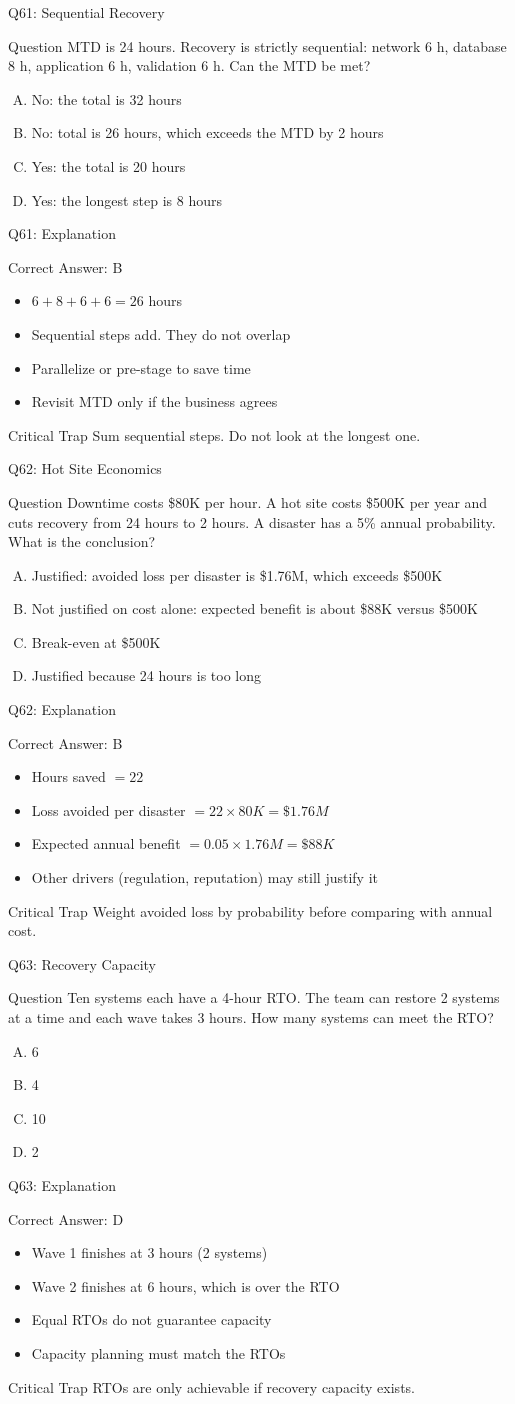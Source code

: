 \documentclass[aspectratio=169]{beamer}
\newcommand{\hq}[7]{%
  \begin{frame}{Q#1: #2}
    \begin{block}{Question}
      #3
    \end{block}
    \begin{enumerate}[(A)]
      #4
    \end{enumerate}
  \end{frame}
  \begin{frame}{Q#1: Explanation}
    \begin{block}{Correct Answer: #5}
      \begin{itemize}
        #6
      \end{itemize}
    \end{block}
    \begin{alertblock}{Critical Trap}
      #7
    \end{alertblock}
  \end{frame}
}
\begin{document}
\hq{61}{Sequential Recovery}
{MTD is 24 hours. Recovery is strictly sequential: network 6 h, database 8 h, application 6 h, validation 6 h. Can the MTD be met?}
{\item No: the total is 32 hours
 \item No: total is 26 hours, which exceeds the MTD by 2 hours
 \item Yes: the total is 20 hours
 \item Yes: the longest step is 8 hours}
{B}
{\item $6 + 8 + 6 + 6 = 26$ hours
 \item Sequential steps add. They do not overlap
 \item Parallelize or pre-stage to save time
 \item Revisit MTD only if the business agrees}
{Sum sequential steps. Do not look at the longest one.}

\hq{62}{Hot Site Economics}
{Downtime costs \$80K per hour. A hot site costs \$500K per year and cuts recovery from 24 hours to 2 hours. A disaster has a 5\% annual probability. What is the conclusion?}
{\item Justified: avoided loss per disaster is \$1.76M, which exceeds \$500K
 \item Not justified on cost alone: expected benefit is about \$88K versus \$500K
 \item Break-even at \$500K
 \item Justified because 24 hours is too long}
{B}
{\item Hours saved $= 22$
 \item Loss avoided per disaster $= 22 \times 80K = \$1.76M$
 \item Expected annual benefit $= 0.05 \times 1.76M = \$88K$
 \item Other drivers (regulation, reputation) may still justify it}
{Weight avoided loss by probability before comparing with annual cost.}

\hq{63}{Recovery Capacity}
{Ten systems each have a 4-hour RTO. The team can restore 2 systems at a time and each wave takes 3 hours. How many systems can meet the RTO?}
{\item 6
 \item 4
 \item 10
 \item 2}
{D}
{\item Wave 1 finishes at 3 hours (2 systems)
 \item Wave 2 finishes at 6 hours, which is over the RTO
 \item Equal RTOs do not guarantee capacity
 \item Capacity planning must match the RTOs}
{RTOs are only achievable if recovery capacity exists.}
\end{document}
